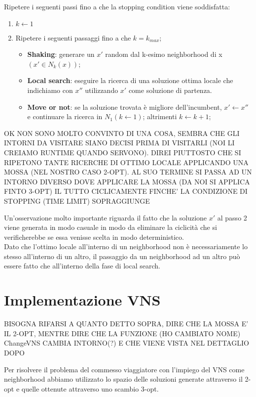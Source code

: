Ripetere i seguenti passi fino a che la stopping condition viene soddisfatta: 
\begin{enumerate}
\item $k \leftarrow 1 $
\item Ripetere i seguenti passaggi fino a che $k=k_{max}$;
\begin{itemize}
\item \textbf{Shaking}: generare un $x'$ random dal k-esimo neighborhood di x $(x' \in N_k(x))$;
\item \textbf{Local search}: eseguire la ricerca di una soluzione ottima locale che indichiamo con $x''$ utilizzando $x'$ come soluzione di partenza.
\item \textbf{Move or not}: se la soluzione trovata è migliore dell'incumbent, $x' \leftarrow x''$ e continuare la ricerca in $N_1 (k \leftarrow 1)$; altrimenti $k \leftarrow k+1$;
\end{itemize}
\end{enumerate}

OK NON SONO MOLTO CONVINTO DI UNA COSA, SEMBRA CHE GLI INTORNI DA VISITARE SIANO DECISI PRIMA DI VISITARLI (NOI LI CREIAMO RUNTIME QUANDO SERVONO). DIREI PIUTTOSTO CHE SI RIPETONO TANTE RICERCHE DI OTTIMO LOCALE APPLICANDO UNA MOSSA (NEL NOSTRO CASO 2-OPT). AL SUO TERMINE SI PASSA AD UN INTORNO DIVERSO DOVE APPLICARE LA MOSSA (DA NOI SI APPLICA FINTO 3-OPT) IL TUTTO CICLICAMENTE FINCHE' LA CONDIZIONE DI STOPPING (TIME LIMIT) SOPRAGGIUNGE

Un'osservazione molto importante riguarda il fatto che la soluzione $x'$ al passo 2 viene generata in modo casuale in modo da eliminare la ciclicità che si verificherebbe se essa venisse scelta in modo deterministico.\\
Dato che l'ottimo locale all'interno di un neighborhood non è necessariamente lo stesso all'interno di un altro, il passaggio da un neighborhood ad un altro può essere fatto che all'interno della fase di local search.

\section{Implementazione VNS}

BISOGNA RIFARSI A QUANTO DETTO SOPRA, DIRE CHE LA MOSSA E' IL 2-OPT, MENTRE DIRE CHE LA FUNZIONE (HO CAMBIATO NOME) ChangeVNS CAMBIA INTORNO(?) E CHE VIENE VISTA NEL DETTAGLIO DOPO

Per risolvere il problema del commesso viaggiatore con l'impiego del VNS come neighborhood abbiamo utilizzato lo spazio delle soluzioni generate attraverso il 2-opt e quelle ottenute attraverso uno scambio 3-opt.

